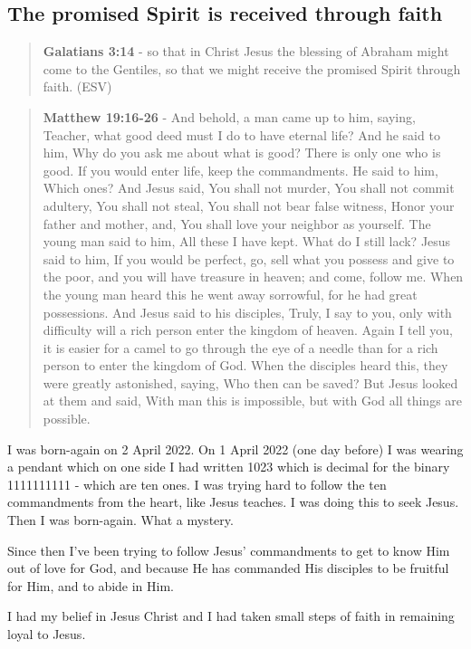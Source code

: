 \documentclass[11pt]{article}
\begin{document}
\subsection{The promised Spirit is received through faith}
\label{sec:org31b90c6}
\begin{quote}
\textbf{Galatians 3:14} - so that in Christ Jesus the blessing of Abraham might come to the Gentiles, so that we might receive the promised Spirit through faith. (ESV)
\end{quote}

\begin{quote}
\textbf{Matthew 19:16-26} - And behold, a man came up to him, saying, Teacher, what good deed must I do to have eternal life? And he said to him, Why do you ask me about what is good? There is only one who is good. If you would enter life, keep the commandments. He said to him, Which ones? And Jesus said, You shall not murder, You shall not commit adultery, You shall not steal, You shall not bear false witness, Honor your father and mother, and, You shall love your neighbor as yourself. The young man said to him, All these I have kept. What do I still lack? Jesus said to him, If you would be perfect, go, sell what you possess and give to the poor, and you will have treasure in heaven; and come, follow me. When the young man heard this he went away sorrowful, for he had great possessions. And Jesus said to his disciples, Truly, I say to you, only with difficulty will a rich person enter the kingdom of heaven. Again I tell you, it is easier for a camel to go through the eye of a needle than for a rich person to enter the kingdom of God. When the disciples heard this, they were greatly astonished, saying, Who then can be saved? But Jesus looked at them and said, With man this is impossible, but with God all things are possible.
\end{quote}

I was born-again on 2 April 2022. On 1 April 2022 (one day before) I was wearing a pendant which on one side I had written 1023 which is decimal for the binary 1111111111 - which are ten ones. I was trying hard to follow the ten commandments from the heart, like Jesus teaches. I was doing this to seek Jesus. Then I was born-again. What a mystery.

Since then I've been trying to follow Jesus' commandments to get to know Him out of love for God, and because He has commanded His disciples to be fruitful for Him, and to abide in Him.

I had my belief in Jesus Christ and I had taken small steps of faith in remaining loyal to Jesus.
\end{document}
